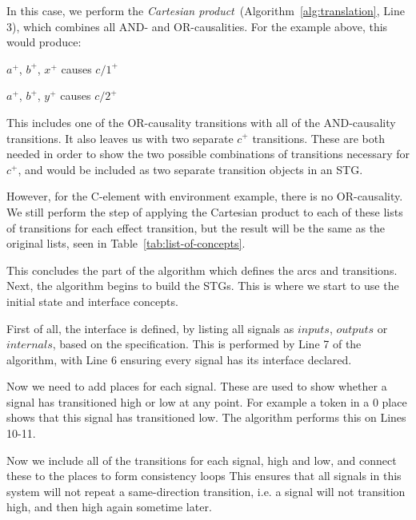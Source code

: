 \documentclass[british,conference,compsoc]{IEEEtran}
\begin{document}
In this case, we perform the \emph{Cartesian product}~(Algorithm~\ref{alg:translation}, Line 3), which combines
all AND- and OR-causalities. For the example above, this would produce:

\vspace{-2mm}

\begin{center}

$a^{+}$, $b^{+}$, $x^{+}$ causes $c/1^{+}$

$a^{+}$, $b^{+}$, $y^{+}$ causes $c/2^{+}$

\end{center}

\vspace{-2mm}

\noindent This includes one of the OR-causality transitions with all of the 
AND-causality transitions. It also leaves us with two separate $c^{+}$ 
transitions. These are both needed in order to show the two possible 
combinations of transitions necessary for $c^{+}$, and would be included as two
separate transition objects in an STG. 

However, for the C-element with environment example, there is no OR-causality. 
We still perform the step of applying the Cartesian product to each of these 
lists of transitions for each effect transition, but the result will be the 
same as the original lists, seen in Table~\ref{tab:list-of-concepts}.

This concludes the part of the algorithm which defines the arcs
and transitions. Next, the algorithm begins to build the STGs. This is where
we start to use the initial state and interface concepts. 

First of all, the interface is defined, by listing all signals as 
$inputs$, $outputs$ or $internals$, based on the specification. This
is performed by Line 7 of the algorithm, with Line 6 ensuring every
signal has its interface declared. 

Now we need to add places for each signal. These are used to
show whether a signal has transitioned high or low at any point. 
For example a token in a $0$ place shows that this signal has 
transitioned low. The algorithm performs this on Lines 10-11.  

Now we include all of the 
transitions for each signal, high and low, and connect these to the places to form consistency loops
This ensures that all signals in this system will not repeat a same-direction transition, i.e. a signal will
not transition high, and then high again sometime later.
\end{document}
